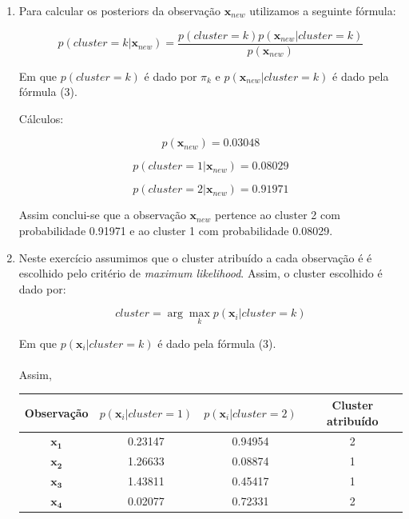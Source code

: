 \documentclass[a4paper,12pt]{article} %
\begin{document}
\begin{enumerate}
\item
Para calcular os posteriors da observação $\mathbf{x}_{new}$ utilizamos a 
seguinte fórmula:

\begin{equation}
    p(cluster = k|\mathbf{x}_{new}) = \frac{p(cluster = k)p(\mathbf{x}_{new}|cluster = k)}{p(\mathbf{x}_{new})}
\end{equation}

Em que $p(cluster = k)$ é dado por $\pi_k$ e $p(\mathbf{x}_{new}|cluster = k)$ é dado pela fórmula (3).

Cálculos:

\begin{equation*}
    p(\mathbf{x}_{new}) = 0.03048
\end{equation*}

\begin{equation*}
    p(cluster = 1|\mathbf{x}_{new}) = 0.08029
\end{equation*}

\begin{equation*}
    p(cluster = 2|\mathbf{x}_{new}) = 0.91971
\end{equation*}

Assim conclui-se que a observação $\mathbf{x}_{new}$ pertence ao cluster 2 com probabilidade 0.91971
e ao cluster 1 com probabilidade 0.08029.

\item Neste exercício assumimos que o cluster atribuído a cada observação é 
é escolhido pelo critério de \textit{maximum likelihood}.
Assim, o cluster escolhido é dado por:

\begin{equation}
    cluster = \arg\max_k p(\mathbf{x}_i|cluster = k)
\end{equation}

Em que $p(\mathbf{x}_i|cluster = k)$ é dado pela fórmula (3). \\ \\

Assim,

\begin{table}[H]
\centering
\begin{tabular}{|c|c|c|c|}
\hline
Observação & $p(\mathbf{x}_i|cluster = 1)$ & $p(\mathbf{x}_i|cluster = 2)$ & Cluster atribuído\\ \hline
$\mathbf{x_1}$ &  0.23147  & 0.94954 & 2 \\ \hline
$\mathbf{x_2}$ &  1.26633  & 0.08874 & 1 \\ \hline
$\mathbf{x_3}$ &  1.43811  & 0.45417 & 1 \\ \hline
$\mathbf{x_4}$ &  0.02077  & 0.72331 & 2 \\ \hline
\end{tabular}
\end{table}


\end{enumerate}
\end{document}
